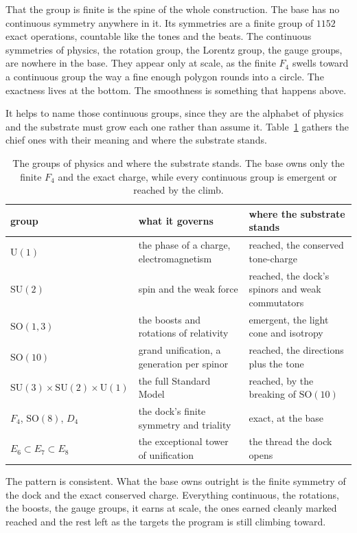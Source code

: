 That the group is finite is the spine of the whole construction. The base has no continuous symmetry anywhere in it. Its symmetries are a finite group of $1152$ exact operations, countable like the tones and the beats. The continuous symmetries of physics, the rotation group, the Lorentz group, the gauge groups, are nowhere in the base. They appear only at scale, as the finite $F_4$ swells toward a continuous group the way a fine enough polygon rounds into a circle. The exactness lives at the bottom. The smoothness is something that happens above.

It helps to name those continuous groups, since they are the alphabet of physics and the substrate must grow each one rather than assume it. Table~\ref{tab:groups} gathers the chief ones with their meaning and where the substrate stands.

\begin{table}[ht]
\centering
\small
\begin{tabular}{@{}lp{}p{}@{}}
\toprule
group & what it governs & where the substrate stands \\
\midrule
$\mathrm{U}(1)$ & the phase of a charge, electromagnetism & reached, the conserved tone-charge \\
$\mathrm{SU}(2)$ & spin and the weak force & reached, the dock's spinors and weak commutators \\
$\mathrm{SO}(1,3)$ & the boosts and rotations of relativity & emergent, the light cone and isotropy \\
$\mathrm{SO}(10)$ & grand unification, a generation per spinor & reached, the directions plus the tone \\
$\mathrm{SU}(3)\times\mathrm{SU}(2)\times\mathrm{U}(1)$ & the full Standard Model & reached, by the breaking of $\mathrm{SO}(10)$ \\
$F_4$, $\mathrm{SO}(8)$, $D_4$ & the dock's finite symmetry and triality & exact, at the base \\
$E_6 \subset E_7 \subset E_8$ & the exceptional tower of unification & the thread the dock opens \\
\bottomrule
\end{tabular}
\caption{The groups of physics and where the substrate stands. The base owns only the finite $F_4$ and the exact charge, while every continuous group is emergent or reached by the climb.}
\label{tab:groups}
\end{table}

The pattern is consistent. What the base owns outright is the finite symmetry of the dock and the exact conserved charge. Everything continuous, the rotations, the boosts, the gauge groups, it earns at scale, the ones earned cleanly marked reached and the rest left as the targets the program is still climbing toward.

